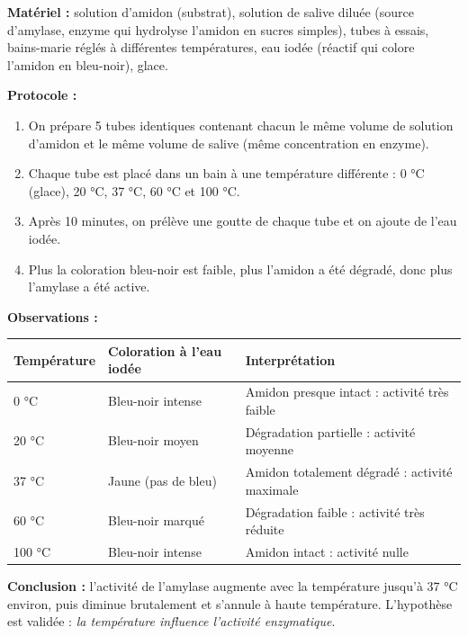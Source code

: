 \documentclass[11pt]{article}
\newcommand{\cle}[1]{{\popxbold\color{popdark}#1}}
\begin{document}
\begin{experience}
\textbf{Matériel :} solution d'amidon (substrat), solution de salive diluée (source d'\cle{amylase}, enzyme qui hydrolyse l'amidon en sucres simples), tubes à essais, bains-marie réglés à différentes températures, eau iodée (réactif qui colore l'amidon en bleu-noir), glace.

\textbf{Protocole :}
\begin{enumerate}
\item On prépare 5 tubes identiques contenant chacun le même volume de solution d'amidon et le même volume de salive (même concentration en enzyme).
\item Chaque tube est placé dans un bain à une température différente : 0 °C (glace), 20 °C, 37 °C, 60 °C et 100 °C.
\item Après 10 minutes, on prélève une goutte de chaque tube et on ajoute de l'eau iodée.
\item Plus la coloration bleu-noir est faible, plus l'amidon a été dégradé, donc plus l'amylase a été active.
\end{enumerate}

\textbf{Observations :}
\begin{center}
\begin{tabularx}{\linewidth}{|l|X|X|}
\hline
\rowcolor{popblueL} \textbf{Température} & \textbf{Coloration à l'eau iodée} & \textbf{Interprétation} \\
\hline
0 °C & Bleu-noir intense & Amidon presque intact : activité très faible \\
\hline
20 °C & Bleu-noir moyen & Dégradation partielle : activité moyenne \\
\hline
37 °C & Jaune (pas de bleu) & Amidon totalement dégradé : activité maximale \\
\hline
60 °C & Bleu-noir marqué & Dégradation faible : activité très réduite \\
\hline
100 °C & Bleu-noir intense & Amidon intact : activité nulle \\
\hline
\end{tabularx}
\end{center}

\textbf{Conclusion :} l'activité de l'amylase augmente avec la température jusqu'à 37 °C environ, puis diminue brutalement et s'annule à haute température. L'hypothèse est validée : \emph{la température influence l'activité enzymatique}.
\end{experience}
\end{document}
